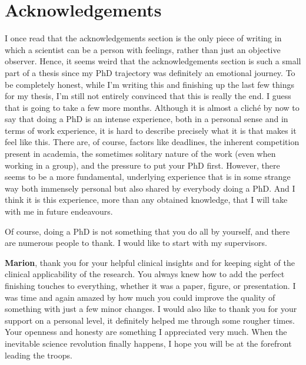 \chapter{Acknowledgements}
\begin{ChapterAbstractNoTitle}
\end{ChapterAbstractNoTitle}

I once read that the acknowledgements section is the only piece of writing in which a scientist can be a person with feelings, rather than just an objective observer.
Hence, it seems weird that the acknowledgements section is such a small part of a thesis since my PhD trajectory was definitely an emotional journey.
To be completely honest, while I'm writing this and finishing up the last few things for my thesis, I'm still not entirely convinced that this is really the end.
I guess that is going to take a few more months.
Although it is almost a clich{\'e} by now to say that doing a PhD is an intense experience, both in a personal sense and in terms of work experience, it is hard to describe precisely what it is that makes it feel like this.
There are, of course, factors like deadlines, the inherent competition present in academia, the sometimes solitary nature of the work (even when working in a group), and the pressure to put your PhD first.
However, there seems to be a more fundamental, underlying experience that is in some strange way both immensely personal but also shared by everybody doing a PhD.
And I think it is this experience, more than any obtained knowledge, that I will take with me in future endeavours.

Of course, doing a PhD is not something that you do all by yourself, and there are numerous people to thank.
I would like to start with my supervisors.

\textbf{Marion}, thank you for your helpful clinical insights and for keeping sight of the clinical applicability of the research.
You always knew how to add the perfect finishing touches to everything, whether it was a paper, figure, or presentation.
I was time and again amazed by how much you could improve the quality of something with just a few minor changes.
I would also like to thank you for your support on a personal level, it definitely helped me through some rougher times.
Your openness and honesty are something I appreciated very much.
When the inevitable science revolution finally happens, I hope you will be at the forefront leading the troops.

